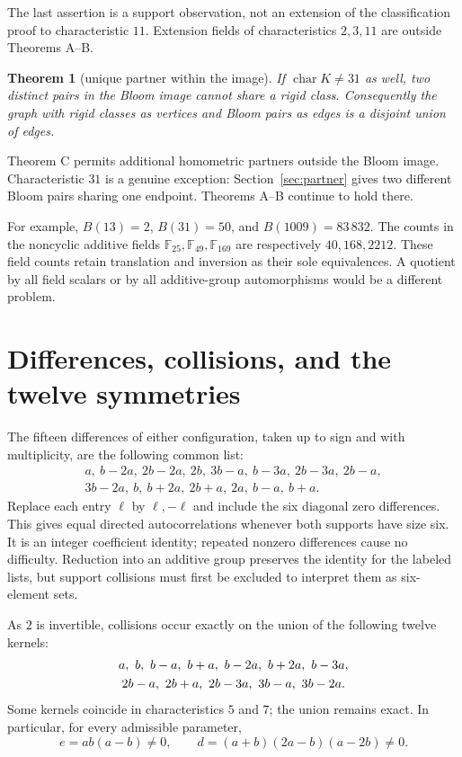 \documentclass[11pt]{article}
\newtheorem{theorem}{Theorem}
\newcommand{\F}{\mathbb F}
\begin{document}
The last assertion is a support observation, not an extension of the
classification proof to characteristic $11$. Extension fields of
characteristics $2,3,11$ are outside Theorems A--B.

\begin{theorem}[unique partner within the image]\label{thm:C}
If $\operatorname{char}K\ne31$ as well, two distinct pairs in the Bloom
image cannot share a rigid class. Consequently the graph with rigid
classes as vertices and Bloom pairs as edges is a disjoint union of edges.
\end{theorem}

Theorem C permits additional homometric partners outside the Bloom image.
Characteristic $31$ is a genuine exception: Section~\ref{sec:partner}
gives two different Bloom pairs sharing one endpoint. Theorems A--B
continue to hold there.

For example, $B(13)=2$, $B(31)=50$, and $B(1009)=83\,832$.
The counts in the noncyclic additive fields $\F_{25},\F_{49},\F_{169}$
are respectively $40,168,2212$. These field counts retain translation
and inversion as their sole equivalences. A quotient by all field
scalars or by all additive-group automorphisms would be a different problem.

\newpage
\section{Differences, collisions, and the twelve symmetries}
The fifteen differences of either configuration, taken up to sign and
with multiplicity, are the following common list:
\begin{gather*}
 a,\ b-2a,\ 2b-2a,\ 2b,\ 3b-a,\ b-3a,\ 2b-3a,\ 2b-a,\\
 3b-2a,\ b,\ b+2a,\ 2b+a,\ 2a,\ b-a,\ b+a.
\end{gather*}
Replace each entry $\ell$ by $\ell,-\ell$ and include the six diagonal
zero differences. This gives equal directed autocorrelations whenever
both supports have size six. It is an integer coefficient identity;
repeated nonzero differences cause no difficulty. Reduction into an
additive group preserves the identity for the labeled lists, but support
collisions must first be excluded to interpret them as six-element sets.

As $2$ is invertible, collisions occur exactly on the union of the
following twelve kernels:
\begin{gather}
 a,\ b,\ b-a,\ b+a,\ b-2a,\ b+2a,\ b-3a,\notag\\
 2b-a,\ 2b+a,\ 2b-3a,\ 3b-a,\ 3b-2a.\label{eq:lines}
\end{gather}
Some kernels coincide in characteristics $5$ and $7$; the union remains
exact. In particular, for every admissible parameter,
\[
 e=ab(a-b)\ne0,\qquad d=(a+b)(2a-b)(a-2b)\ne0.
\]
\end{document}
